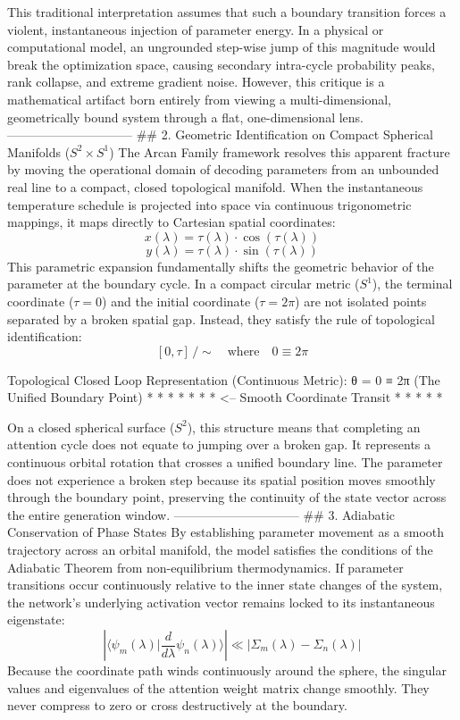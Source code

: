 This traditional interpretation assumes that such a boundary transition forces a violent, instantaneous injection of parameter energy. In a physical or computational model, an ungrounded step-wise jump of this magnitude would break the optimization space, causing secondary intra-cycle probability peaks, rank collapse, and extreme gradient noise. However, this critique is a mathematical artifact born entirely from viewing a multi-dimensional, geometrically bound system through a flat, one-dimensional lens.
------------------------------
## 2. Geometric Identification on Compact Spherical Manifolds ($S^2 \times S^1$)
The Arcan Family framework resolves this apparent fracture by moving the operational domain of decoding parameters from an unbounded real line to a compact, closed topological manifold. When the instantaneous temperature schedule is projected into space via continuous trigonometric mappings, it maps directly to Cartesian spatial coordinates:
$$x(\lambda) = \tau(\lambda) \cdot \cos(\tau(\lambda))$$ 
$$y(\lambda) = \tau(\lambda) \cdot \sin(\tau(\lambda))$$ 
This parametric expansion fundamentally shifts the geometric behavior of the parameter at the boundary cycle. In a compact circular metric ($S^1$), the terminal coordinate ($\tau = 0$) and the initial coordinate ($\tau = 2\pi$) are not isolated points separated by a broken spatial gap. Instead, they satisfy the rule of topological identification:
$$[0, \tau] \, / \sim \quad \text{where} \quad 0 \equiv 2\pi$$ 

Topological Closed Loop Representation (Continuous Metric):
                θ = 0 ≡ 2π (The Unified Boundary Point)
                       *   *   *
                    *             *
                  *                 *  <-- Smooth Coordinate Transit
                   *               *
                      *   *   *

On a closed spherical surface ($S^2$), this structure means that completing an attention cycle does not equate to jumping over a broken gap. It represents a continuous orbital rotation that crosses a unified boundary line. The parameter does not experience a broken step because its spatial position moves smoothly through the boundary point, preserving the continuity of the state vector across the entire generation window.
------------------------------
## 3. Adiabatic Conservation of Phase States
By establishing parameter movement as a smooth trajectory across an orbital manifold, the model satisfies the conditions of the Adiabatic Theorem from non-equilibrium thermodynamics. If parameter transitions occur continuously relative to the inner state changes of the system, the network's underlying activation vector remains locked to its instantaneous eigenstate:
$$\left\vert{} \langle \psi_m(\lambda) \vert{} \frac{d}{d\lambda} \psi_n(\lambda) \rangle \right\vert{} \ll \vert{}\Sigma_m(\lambda) - \Sigma_n(\lambda)\vert{}$$ 
Because the coordinate path winds continuously around the sphere, the singular values and eigenvalues of the attention weight matrix change smoothly. They never compress to zero or cross destructively at the boundary.


